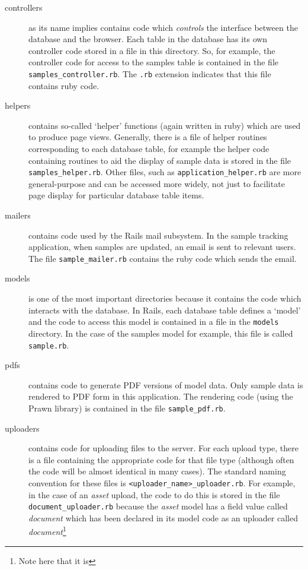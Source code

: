 \documentclass[12pt,twoside]{article}
\begin{document}
\begin{description}
\item[controllers]
as its name implies contains code which \emph{controls} the interface
between the database and the browser. Each table in the database has its
own controller code stored in a file in this directory. So, for example, the
controller code for access to the samples table is contained in the file
\verb=samples_controller.rb=. The \verb=.rb= extension indicates that this
file contains ruby code.
\item[helpers]
contains so-called `helper' functions (again written in ruby) which are
used to produce page views. Generally, there is a file of helper
routines corresponding to each database table, for example the helper
code containing routines to aid the display of sample data is stored in
the file \verb=samples_helper.rb=. Other files, such as
\verb=application_helper.rb= are more general-purpose and can be accessed
more widely, not just to facilitate page display for particular database
table items.
\item[mailers]
contains code used by the Rails mail subsystem. In the sample tracking
application, when samples are updated, an email is sent to relevant users.
The file \verb=sample_mailer.rb= contains the ruby code which sends the
email.
\item[models]
is one of the most important directories because it contains the code
which interacts with the database. In Rails, each database table defines
a `model' and the code to access this model is contained in a file in the
\verb=models= directory. In the case of the samples model for example, this
file is called \verb=sample.rb=.
\item[pdfs]
contains code to generate PDF versions of model data. Only sample data is
rendered to PDF form in this application. The rendering code (using the
Prawn library) is contained in the file \verb=sample_pdf.rb=.
\item[uploaders]
contains code for uploading files to the server. For each upload type, there
is a file containing the appropriate code for that file type (although
often the code will be almost identical in many cases). The standard
naming convention
for these files is \verb=<uploader_name>_uploader.rb=. For example, in the
case of an \emph{asset} upload, the code to do this is stored in the
file \verb=document_uploader.rb= because the \emph{asset} model has
a field value called \emph{document} which has been declared in its model
code as an uploader called \emph{document}\footnote{Note here that it is
}
\end{description}
\end{document}
